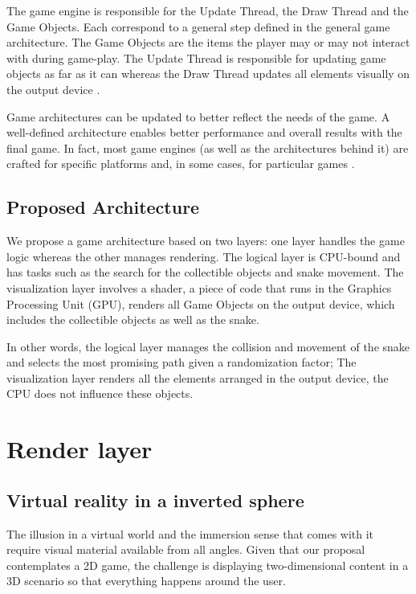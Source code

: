 \documentclass[runningheads]{llncs}
\begin{document}
The game engine is responsible for the Update Thread, the Draw Thread and the Game Objects. Each correspond to a general step defined in the general game architecture. The Game Objects are the items the player may or may not interact with during game-play. The Update Thread  is responsible for updating game objects as far as it can whereas the Draw Thread updates all elements visually on the output device \cite{portales}.

Game architectures can be updated to better reflect the needs of the game. A well-defined architecture enables better performance and overall results with the final game. In fact, most game engines (as well as the architectures behind it) are crafted for specific platforms and, in some cases, for particular games \cite{gregory_2019}. 


\subsection{Proposed Architecture} \label{sec:proposed-architecture}
We propose a game architecture based on two layers: 
one layer handles the game logic whereas the other manages rendering.  The logical layer is CPU-bound and has tasks such as the search for the collectible objects and snake movement. 
The visualization layer involves a shader, a piece of code that runs in the Graphics Processing Unit (GPU), renders all Game Objects on the output device, which includes the collectible objects as well as the snake.

In other words, the logical layer manages the collision and movement of the snake and selects the most promising path given a randomization factor; The visualization layer renders all the elements arranged in the output device, the CPU does not influence these objects.

\section{Render layer}

\subsection{Virtual reality in a inverted sphere}
The illusion in a virtual world and the immersion sense that comes with it require visual material available from all angles. Given that our proposal contemplates a 2D game, the challenge is displaying two-dimensional content in a 3D scenario so that everything happens around the user.
\end{document}
